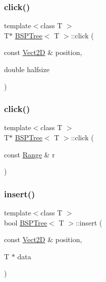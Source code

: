 \mbox{\label{classBSPTree_a442f2b98cf404a7467daea83fda59d9e_a442f2b98cf404a7467daea83fda59d9e}} 
\subsubsection{\texorpdfstring{click()}{click()}\hspace{0.1cm}{\footnotesize\ttfamily [2/3]}}
{\footnotesize\ttfamily template$<$class T $>$ \\
T$\ast$ \hyperlink{classBSPTree}{B\+S\+P\+Tree}$<$ T $>$\+::click (\begin{DoxyParamCaption}\item[{const \hyperlink{classVect2D}{Vect2D} \&}]{position,  }\item[{double}]{halfsize }\end{DoxyParamCaption})\hspace{0.3cm}{\ttfamily [inline]}}

\mbox{\label{classBSPTree_a5dca4c571d2ad30c13b90710ad479df3_a5dca4c571d2ad30c13b90710ad479df3}} 
\subsubsection{\texorpdfstring{click()}{click()}\hspace{0.1cm}{\footnotesize\ttfamily [3/3]}}
{\footnotesize\ttfamily template$<$class T $>$ \\
T$\ast$ \hyperlink{classBSPTree}{B\+S\+P\+Tree}$<$ T $>$\+::click (\begin{DoxyParamCaption}\item[{const \hyperlink{classRange}{Range} \&}]{r }\end{DoxyParamCaption})\hspace{0.3cm}{\ttfamily [inline]}}

\mbox{\label{classBSPTree_ac4d6edf03e621e59e96b27b4943d304c_ac4d6edf03e621e59e96b27b4943d304c}} 
\subsubsection{\texorpdfstring{insert()}{insert()}}
{\footnotesize\ttfamily template$<$class T $>$ \\
bool \hyperlink{classBSPTree}{B\+S\+P\+Tree}$<$ T $>$\+::insert (\begin{DoxyParamCaption}\item[{const \hyperlink{classVect2D}{Vect2D} \&}]{position,  }\item[{T $\ast$}]{data }\end{DoxyParamCaption})\hspace{0.3cm}{\ttfamily [inline]}}


